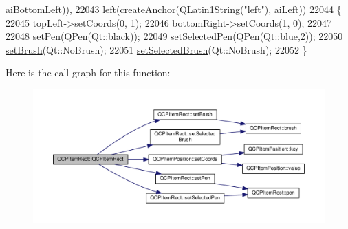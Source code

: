 \begin{DoxyCode}
      \hyperlink{class_q_c_p_item_rect_af0ebba58e6bca4851c4db726691ec0d3ab3c42dbb1709a04ba9b03dcbf5a2537a}{aiBottomLeft})),
22043   \hyperlink{class_q_c_p_item_rect_aad0ca1af0c8debfc20d7b47fc942764d}{left}(\hyperlink{class_q_c_p_abstract_item_af3fc92527802078ca395138748b629a7}{createAnchor}(QLatin1String(\textcolor{stringliteral}{"left"}), \hyperlink{class_q_c_p_item_rect_af0ebba58e6bca4851c4db726691ec0d3a8a095c6d6b2e7665a15d9f40c94b47dc}{aiLeft}))
22044 \{
22045   \hyperlink{class_q_c_p_item_rect_aa70feeef173489b03c3fbe906a5023c4}{topLeft}->\hyperlink{class_q_c_p_item_position_aa988ba4e87ab684c9021017dcaba945f}{setCoords}(0, 1);
22046   \hyperlink{class_q_c_p_item_rect_a409f3bfe615a7e322bb3d4d193d85b26}{bottomRight}->\hyperlink{class_q_c_p_item_position_aa988ba4e87ab684c9021017dcaba945f}{setCoords}(1, 0);
22047   
22048   \hyperlink{class_q_c_p_item_rect_a483c0da5a17e1646cd17ddea2c124e7d}{setPen}(QPen(Qt::black));
22049   \hyperlink{class_q_c_p_item_rect_a52a1bcb2dc753a538e406a2ba3cf21ce}{setSelectedPen}(QPen(Qt::blue,2));
22050   \hyperlink{class_q_c_p_item_rect_abbd4e346a03513ee466afc25d9c75446}{setBrush}(Qt::NoBrush);
22051   \hyperlink{class_q_c_p_item_rect_abd1792859844118dedee86223cede7af}{setSelectedBrush}(Qt::NoBrush);
22052 \}
\end{DoxyCode}


Here is the call graph for this function\+:\nopagebreak
\begin{figure}[H]
\begin{center}
\leavevmode
\includegraphics[width=350pt]{class_q_c_p_item_rect_a412ad1579f7a1fba453d0fa28c496cbc_cgraph}
\end{center}
\end{figure}


\hypertarget{class_q_c_p_item_rect_af9e89f80457afc2d0fd2c6527b40a5f2}{}
